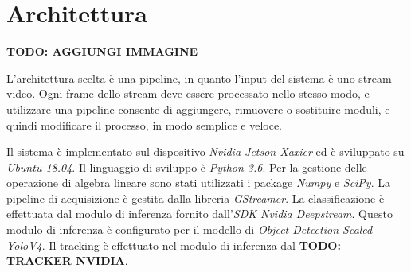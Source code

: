 \chapter{Architettura}
\label{sec:architettura}



\textbf{TODO: AGGIUNGI IMMAGINE}

L'architettura scelta è una pipeline, in quanto l'input del sistema è uno stream video.
Ogni frame dello stream deve essere processato nello stesso modo, e utilizzare una pipeline consente di aggiungere, rimuovere o sostituire moduli, e quindi modificare il processo, in modo semplice e veloce.

Il sistema è implementato sul dispositivo \emph{Nvidia Jetson Xaxier}\cite{arch:jetson} ed è sviluppato su \emph{Ubuntu 18.04}\cite{arch:ubuntu}.
Il linguaggio di sviluppo è \emph{Python 3.6}\cite{arch:python}.
Per la gestione delle operazione di algebra lineare sono stati utilizzati i package \emph{Numpy}\cite{arch:numpy} e \emph{SciPy}\cite{arch:scipy}.
La pipeline di acquisizione è gestita dalla libreria \emph{GStreamer}\cite{arch:gstreamer}.
La classificazione è effettuata dal modulo di inferenza fornito dall'\emph{SDK Nvidia Deepstream}\cite{arch:deepstream}.
Questo modulo di inferenza è configurato per il modello di \emph{Object Detection Scaled--YoloV4}\cite{arch:yolo}.
Il tracking è effettuato nel modulo di inferenza dal \textbf{TODO: TRACKER NVIDIA}.
